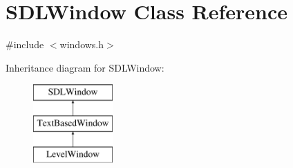 \hypertarget{class_s_d_l_window}{}\section{S\+D\+L\+Window Class Reference}
\label{class_s_d_l_window}


{\ttfamily \#include $<$windows.\+h$>$}

Inheritance diagram for S\+D\+L\+Window\+:\begin{figure}[H]
\begin{center}
\leavevmode
\includegraphics[height=3.000000cm]{class_s_d_l_window}
\end{center}
\end{figure}
